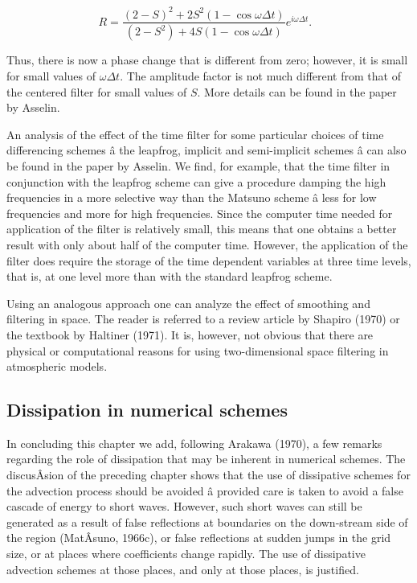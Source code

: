 {\[R = \frac{( 2 - S )^{2} + 2S^{2}\left( 1 - \cos{\omega\Delta t} \right)}{( 2 - S^{2} ) + 4S\left( 1 - \cos{\omega\Delta t} \right)}e^{i\omega\Delta t}.\text{        }\]}

Thus, there is now a phase change that is different from zero; however,
it is small for small values of \(\omega\Delta t\). The amplitude factor
is not much different from that of the centered filter for small values
of \(S\). More details can be found in the paper by Asselin.

An analysis of the effect of the time filter for some particular choices
of time differencing schemes â the leapfrog, implicit and semi-implicit
schemes â can also be found in the paper by Asselin. We find, for
example, that the time filter in conjunction with the leapfrog scheme
can give a procedure damping the high frequencies in a more selective
way than the Matsuno scheme â less for low frequencies and more for high
frequencies. Since the computer time needed for application of the
filter is relatively small, this means that one obtains a better result
with only about half of the computer time. However, the application of
the filter does require the storage of the time dependent variables at
three time levels, that is, at one level more than with the standard
leapfrog scheme.

Using an analogous approach one can analyze the effect of smoothing and
filtering in space. The reader is referred to a review article by
Shapiro (1970) or the textbook by Haltiner (1971). It is, however, not
obvious that there are physical or computational reasons for using
two-dimensional space filtering in atmospheric models.

\subsection{\texorpdfstring{\textbf{Dissipation in numerical
schemes}}{Dissipation in numerical schemes}}\label{dissipation-in-numerical-schemes}

In concluding this chapter we add, following Arakawa (1970), a few
remarks regarding the role of dissipation that may be inherent in
numerical schemes. The discusÂ­sion of the preceding chapter shows that
the use of dissipative schemes for the advection process should be
avoided â provided care is taken to avoid a false cascade of energy to
short waves. However, such short waves can still be generated as a
result of false reflections at boundaries on the down-stream side of the
region (MatÂ­suno, 1966c), or false reflections at sudden jumps in the
grid size, or at places where coefficients change rapidly. The use of
dissipative advection schemes at those places, and only at those places,
is justified.

